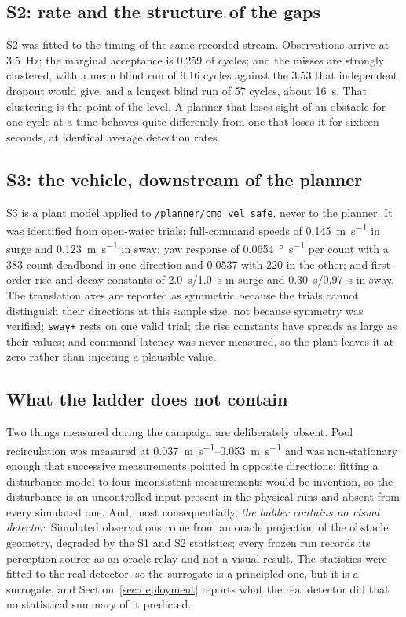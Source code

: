 \subsection{S2: rate and the structure of the gaps}

S2 was fitted to the timing of the same recorded stream. Observations
arrive at \SI{3.5}{\hertz}; the marginal acceptance is \num{0.259} of
cycles; and the misses are strongly clustered, with a mean blind run of
\num{9.16} cycles against the \num{3.53} that independent dropout would
give, and a longest blind run of \num{57} cycles, about \SI{16}{\second}.
That clustering is the point of the level. A planner that loses sight of
an obstacle for one cycle at a time behaves quite differently from one
that loses it for sixteen seconds, at identical average detection rates.

\subsection{S3: the vehicle, downstream of the planner}

S3 is a plant model applied to \texttt{/planner/cmd\_vel\_safe}, never to
the planner. It was identified from open-water trials: full-command
speeds of \SI{0.145}{\metre\per\second} in surge and
\SI{0.123}{\metre\per\second} in sway; yaw response of
\SI{0.0654}{\degree\per\second} per count with a 383-count deadband in
one direction and \num{0.0537} with 220 in the other; and first-order
rise and decay constants of \SI{2.0}{\second}/\SI{1.0}{\second} in surge
and \SI{0.30}{\second}/\SI{0.97}{\second} in sway. The translation axes
are reported as symmetric because the trials cannot distinguish their
directions at this sample size, not because symmetry was verified;
\texttt{sway+} rests on one valid trial; the rise constants have spreads
as large as their values; and command latency was never measured, so the
plant leaves it at zero rather than injecting a plausible value.

\subsection{What the ladder does not contain}

Two things measured during the campaign are deliberately absent. Pool
recirculation was measured at \SIrange{0.037}{0.053}{\metre\per\second}
and was non-stationary enough that successive measurements pointed in
opposite directions; fitting a disturbance model to four inconsistent
measurements would be invention, so the disturbance is an uncontrolled
input present in the physical runs and absent from every simulated one.
And, most consequentially, \emph{the ladder contains no visual detector}.
Simulated observations come from an oracle projection of the obstacle
geometry, degraded by the S1 and S2 statistics; every frozen run records
its perception source as an oracle relay and not a visual result. The
statistics were fitted to the real detector, so the surrogate is a
principled one, but it is a surrogate, and Section~\ref{sec:deployment}
reports what the real detector did that no statistical summary of it
predicted.
